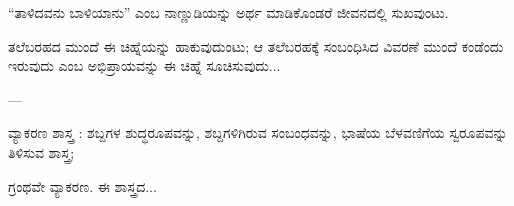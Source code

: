 \vspace{2.5pt plus 3pt minus 0.5pt}\noindent\hspace*{1.2em}\hspace{0.55em}“ತಾಳಿದವನು ಬಾಳಿಯಾನು” ಎಂಬ ನಾಣ್ಣುಡಿಯನ್ನು ಅರ್ಥ ಮಾಡಿಕೊಂಡರೆ ಜೀವನದಲ್ಲಿ ಸುಖವುಂಟು.\par

\vspace{4pt plus 4pt minus 1pt}\hspace{0.5em}ತಲೆಬರಹದ ಮುಂದೆ ಈ ಚಿಹ್ನೆಯನ್ನು ಹಾಕುವುದುಂಟು; ಆ ತಲೆಬರಹಕ್ಕೆ ಸಂಬಂಧಿಸಿದ ವಿವರಣೆ ಮುಂದೆ ಕಂಡೆಂದು ಇರುವುದು ಎಂಬ ಅಭಿಪ್ರಾಯವನ್ನು ಈ ಚಿಹ್ನೆ ಸೂಚಿಸುವುದು...\par

\noindent\hspace*{1.2em}\hspace{0.6em}—\par

\indent ವ್ಯಾಕರಣ ಶಾಸ್ತ್ರ : ಶಬ್ದಗಳ ಶುದ್ಧರೂಪವನ್ನು, ಶಬ್ದಗಳಿಗಿರುವ ಸಂಬಂಧವನ್ನು, ಭಾಷೆಯ ಬೆಳವಣಿಗೆಯ ಸ್ವರೂಪವನ್ನು ತಿಳಿಸುವ ಶಾಸ್ತ್ರ;\par

\noindent\hspace*{2.2em}ಗ್ರಂಥವೇ ವ್ಯಾಕರಣ. ಈ ಶಾಸ್ತ್ರದ...\par
